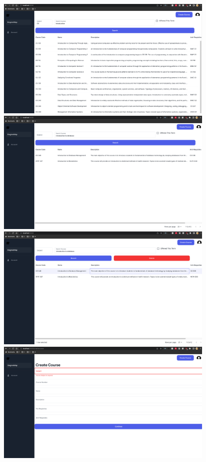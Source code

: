 \documentclass[12pt, a4paper]{article}
\begin{document}
\begin{center}
    \includegraphics[width=400px]{images/R7/i1}
    \includegraphics[width=400px]{images/R7/i2}
    \includegraphics[width=400px]{images/R7/i3}
    \includegraphics[width=400px]{images/R7/i4}
\end{center}
\end{document}
